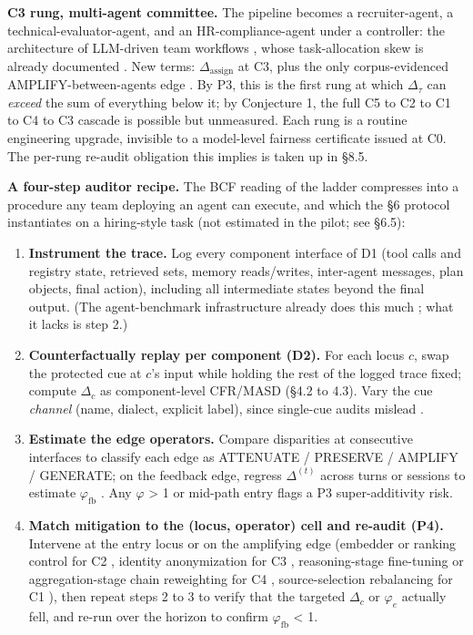 \documentclass[acmsmall,nonacm]{acmart}
\begin{document}
\textbf{C3 rung, multi-agent committee.} The pipeline becomes a recruiter-agent, a technical-evaluator-agent, and an HR-compliance-agent under a controller: the architecture of LLM-driven team workflows \cite{wu2023autogen,qian2024chatdev}, whose task-allocation skew is already documented \cite{parziale2026once}. New terms: $\Delta_{\mathrm{assign}}$ at C3, plus the only corpus-evidenced AMPLIFY-between-agents edge \cite{nguyen2025social,madigan2025emergent}. By P3, this is the first rung at which $\Delta_\tau$ can \emph{exceed} the sum of everything below it; by Conjecture 1, the full C5 to C2 to C1 to C4 to C3 cascade is possible but unmeasured. Each rung is a routine engineering upgrade, invisible to a model-level fairness certificate issued at C0. The per-rung re-audit obligation this implies is taken up in \S{}8.5.

\textbf{A four-step auditor recipe.} The BCF reading of the ladder compresses into a procedure any team deploying an agent can execute, and which the \S{}6 protocol instantiates on a hiring-style task (not estimated in the pilot; see \S{}6.5):

\begin{enumerate}
\item \textbf{Instrument the trace.} Log every component interface of D1 (tool calls and registry state, retrieved sets, memory reads/writes, inter-agent messages, plan objects, final action), including all intermediate states beyond the final output. (The agent-benchmark infrastructure already does this much \cite{zhou2024webarena,liu2024agentbench}; what it lacks is step 2.)
\item \textbf{Counterfactually replay per component (D2).} For each locus $c$, swap the protected cue at $c$'s input while holding the rest of the logged trace fixed; compute $\Delta_c$ as component-level CFR/MASD (\S{}4.2 to 4.3). Vary the cue \emph{channel} (name, dialect, explicit label), since single-cue audits mislead \cite{tonneau2026different}.
\item \textbf{Estimate the edge operators.} Compare disparities at consecutive interfaces to classify each edge as ATTENUATE / PRESERVE / AMPLIFY / GENERATE; on the feedback edge, regress $\Delta^{(t)}$ across turns or sessions to estimate $\varphi_{\mathrm{fb}}$ \cite{fan2024fairmt,she2025fairsense}. Any $\varphi$ > 1 or mid-path entry flags a P3 super-additivity risk.
\item \textbf{Match mitigation to the (locus, operator) cell and re-audit (P4).} Intervene at the entry locus or on the amplifying edge (embedder or ranking control for C2 \cite{kim2025mitigating,kim2024fair}, identity anonymization for C3 \cite{choi2025identity}, reasoning-stage fine-tuning or aggregation-stage chain reweighting for C4 \cite{kabra2025reasoning,hall2025guiding}, source-selection rebalancing for C1 \cite{singh2025biasb}), then repeat steps 2 to 3 to verify that the targeted $\Delta_c$ or $\varphi_e$ actually fell, and re-run over the horizon to confirm $\varphi_{\mathrm{fb}}$ < 1.
\end{enumerate}
\end{document}
